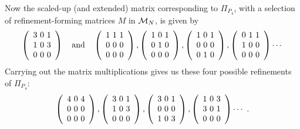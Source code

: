 \documentclass[runningheads]{llncs}
\newcommand{\FinerMatrices}{{\cal M}} \newcommand{\StratMatrices}{{\cal G}}
\newcommand\Wide[1] {~~~#1~~~}
\begin{document}
Now the scaled-up (and extended) matrix corresponding to $\Pi_{P_4}$, with a selection of refinement-forming matrices $M$ in $\FinerMatrices_N$, is given by
\[
 \left(
 \begin{array}{c@{~}c@{~}c}
  3 & 0 & 1 \\
  1 & 0 & 3 \\
  0 & 0 & 0
 \end{array}
 \right)
 \Wide{\textrm{and}}
 \left(
 \begin{array}{c@{~}c@{~}c}
  1 & 1 & 1 \\
  0 & 0 & 0 \\
  0 & 0 & 0
 \end{array}
 \right) ,
 \left(
 \begin{array}{c@{~}c@{~}c}
  1 & 0 & 1 \\
  0 & 1 & 0 \\
  0 & 0 & 0
 \end{array}
 \right) ,
 \left(
 \begin{array}{c@{~}c@{~}c}
  1 & 0 & 1 \\
  0 & 0 & 0 \\
  0 & 1 & 0
 \end{array}
 \right) ,
 \left(
 \begin{array}{c@{~}c@{~}c}
  0 & 1 & 1 \\
  1 & 0 & 0 \\
  0 & 0 & 0
 \end{array}
 \right) \cdots
\]
Carrying out the matrix multiplications gives us these four possible refinements of $\Pi_{P_4}$:
\[
  \left(
 \begin{array}{c@{~}c@{~}c}
  4 & 0 & 4 \\
  0 & 0 & 0 \\
  0 & 0 & 0
 \end{array}
 \right) ,
 \left(
 \begin{array}{c@{~}c@{~}c}
  3 & 0 & 1 \\
  1 & 0 & 3 \\
  0 & 0 & 0
 \end{array}
 \right) ,
 \left(
 \begin{array}{c@{~}c@{~}c}
  3 & 0 & 1 \\
  0 & 0 & 0 \\
  1 & 0 & 3
 \end{array}
 \right) ,
 \left(
 \begin{array}{c@{~}c@{~}c}
  1 & 0 & 3 \\
  3 & 0 & 1 \\
  0 & 0 & 0
 \end{array}
 \right) \cdots~.
\]
\end{document}
